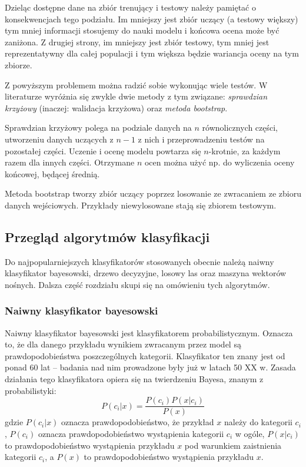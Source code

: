 \documentclass[../thesis.tex]{subfiles}
\begin{document}
Dzieląc dostępne dane na zbiór trenujący i testowy należy pamiętać o konsekwencjach tego podziału. Im mniejszy jest zbiór uczący (a testowy większy) tym mniej informacji stosujemy do nauki modelu i końcowa ocena może być zaniżona. Z drugiej strony, im mniejszy jest zbiór testowy, tym mniej jest reprezentatywny dla całej populacji i tym większa będzie wariancja oceny na tym zbiorze. 

Z  powyższym problemem można radzić sobie wykonując wiele testów. W literaturze wyróżnia się zwykle dwie metody z tym związane: \emph{sprawdzian krzyżowy} (inaczej: walidacja krzyżowa) oraz \emph{metoda bootstrap}.

Sprawdzian krzyżowy polega na podziale danych na $n$ równolicznych części, utworzeniu danych uczących z $n-1$ z nich i przeprowadzeniu testów na pozostałej części. Uczenie i ocenę modelu powtarza się $n$-krotnie, za każdym razem dla innych części. Otrzymane $n$ ocen można użyć np. do wyliczenia oceny końcowej, będącej średnią. 

Metoda bootstrap tworzy zbiór uczący poprzez losowanie ze zwracaniem ze zbioru danych wejściowych. Przykłady niewylosowane stają się zbiorem testowym.

\subsection{Przegląd algorytmów klasyfikacji}

Do najpopularniejszych klasyfikatorów stosowanych obecnie należą naiwny klasyfikator bayesowski, drzewo decyzyjne, losowy las oraz maszyna wektorów nośnych. Dalsza część rozdziału skupi się na omówieniu tych algorytmów.

\subsubsection{Naiwny klasyfikator bayesowski}

Naiwny klasyfikator bayesowski jest klasyfikatorem probabilistycznym. Oznacza to, że dla danego przykładu wynikiem zwracanym przez model są prawdopodobieństwa poszczególnych kategorii. Klasyfikator ten znany jest od ponad 60 lat – badania nad nim prowadzone były już w latach 50 XX w. Zasada działania tego klasyfikatora opiera się na twierdzeniu Bayesa, znanym z probabilistyki:
\[P(c_i|x) = \frac{P(c_i)P(x|c_i)}{P(x)}\]
gdzie $P(c_i|x)$ oznacza prawdopodobieństwo, że przykład $x$ należy do kategorii $c_i$, $P(c_i)$ oznacza prawdopodobieństwo wystąpienia kategorii $c_i$ w ogóle, $P(x|c_i)$ to prawdopodobieństwo wystąpienia przykładu $x$ pod warunkiem zaistnienia kategorii $c_i$, a $P(x)$ to prawdopodobieństwo wystąpienia przykładu $x$.
\end{document}
